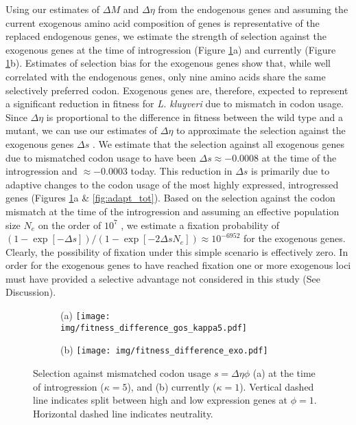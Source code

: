 \documentclass[doublespacing,linenumbers]{bmcart}
\newcommand{\kluyveri}{\textit{L. kluyveri}\xspace}
\newcommand{\DE}{\ensuremath{{\Delta \eta}}\xspace}
\newcommand{\Ne}{\ensuremath{N_e}\xspace}
\newcommand{\GL}{\ensuremath{{\Delta s}}\xspace}
\begin{document}
Using our estimates of $\Delta M$ and $\Delta \eta$ from the endogenous genes and assuming the current exogenous amino acid composition of genes is representative of the replaced endogenous genes, we estimate the strength of selection against the exogenous genes at the time of introgression (Figure \ref{fig:sne_fitness_burden}a) and currently (Figure \ref{fig:sne_fitness_burden}b).
Estimates of selection bias for the exogenous genes show that, while well correlated with the endogenous genes, only nine amino acids share the same selectively preferred codon.
Exogenous genes are, therefore, expected to represent a significant reduction in fitness for \kluyveri due to mismatch in codon usage.
Since \DE is proportional to the difference in fitness between the wild type and a mutant, we can use our estimates of \DE to approximate the selection against the exogenous genes $\GL$ \citep{SellaAndHirsh2005,gilchrist2015}. 
We estimate that the selection against all exogenous genes due to mismatched codon usage to have been $\GL \approx -0.0008$ at the time of the introgression and $\approx -0.0003$ today.
This reduction in $\GL$ is primarily due to adaptive changes to the codon usage of the most highly expressed, introgressed genes (Figures \ref{fig:sne_fitness_burden}a \& \ref{fig:adapt_tot}).
Based on the selection against the codon mismatch at the time of the introgression and assuming an effective population size $\Ne$ on the order of $10^7$ \citep{wagner2005}, we estimate a fixation probability of $(1-\exp[-\GL])/(1-\exp[-2\GL \Ne]) \approx 10^{-6952}$ \citep{SellaAndHirsh2005} for the exogenous genes.
Clearly, the possibility of fixation under this simple scenario is effectively zero.
In order for the exogenous genes to have reached fixation one or more exogenous loci must have provided a selective advantage not considered in this study (See Discussion).



\begin{figure}
    \centering
    \begin{subfigure}
        \centering
        (a) \texttt{[image: img/fitness\_difference\_gos\_kappa5.pdf]}
    \end{subfigure}
    \begin{subfigure}
        \centering
        (b) \texttt{[image: img/fitness\_difference\_exo.pdf]}
    \end{subfigure}
    \caption{Selection against mismatched codon usage $s = \DE \phi$ (a) at the time of introgression ($\kappa = 5$), and (b) currently ($\kappa = 1$). 
        Vertical dashed line indicates split between high and low expression genes at $\phi = 1$.
    	Horizontal dashed line indicates neutrality.}
    \label{fig:sne_fitness_burden}
\end{figure}
\end{document}
